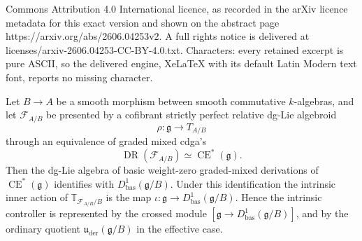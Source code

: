 \documentclass[10pt,a4paper]{amsart}
\DeclareMathOperator{\CE}{CE}
\DeclareMathOperator{\DR}{DR}
\newcommand{\bas}{\mathrm{bas}}
\newcommand{\bbT}{\mathbb T}
\newcommand{\cF}{\mathcal F}
\newcommand{\from}{\colon}
\newcommand{\g}{\mathfrak g}
\newcommand{\kk}{k}
\newcommand{\uuder}{\mathfrak u_{\mathrm{der}}}
\begin{document}
Commons Attribution 4.0 International licence, as recorded in the arXiv licence metadata for this exact version and shown on the abstract page https://arxiv.org/abs/2606.04253v2. A full rights notice is delivered at licenses/arxiv-2606.04253-CC-BY-4.0.txt. Characters: every retained excerpt is pure ASCII, so the delivered engine, XeLaTeX with its default Latin Modern text font, reports no missing character.
\begin{proposition}\label{prop:intrinsic-comparison}
Let \(B\to A\) be a smooth morphism between smooth commutative \(\kk\)-algebras, and let \(\cF_{A/B}\) be presented by a cofibrant strictly perfect relative dg-Lie algebroid
\[
 \rho\from\g\longrightarrow T_{A/B}
\]
through an equivalence of graded mixed cdga's
\[
 \DR(\cF_{A/B})\simeq\CE^*(\g).
\]
Then the dg-Lie algebra of basic weight-zero graded-mixed derivations of \(\CE^*(\g)\) identifies with \(D^1_{\bas}(\g/B)\). Under this identification the intrinsic inner action of \(\bbT_{\cF_{A/B}/B}\) is the map \(\iota\from\g\to D^1_{\bas}(\g/B)\). Hence the intrinsic controller is represented by the crossed module \([\g\to D^1_{\bas}(\g/B)]\), and by the ordinary quotient \(\uuder(\g/B)\) in the effective case.
\end{proposition}
\end{document}

